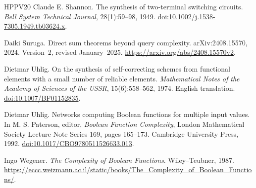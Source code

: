 \documentclass[11pt]{article}
\begin{document}
\begin{thebibliography}{HPPV20}
Claude E. Shannon.
\newblock The synthesis of two-terminal switching circuits.
\newblock \emph{Bell System Technical Journal}, 28(1):59--98, 1949.
\newblock \href{https://doi.org/10.1002/j.1538-7305.1949.tb03624.x}{doi:10.1002/j.1538-7305.1949.tb03624.x}.

Daiki Suruga.
\newblock Direct sum theorems beyond query complexity.
\newblock arXiv:2408.15570, 2024. Version~2, revised January~2025.
\newblock \url{https://arxiv.org/abs/2408.15570v2}.

Dietmar Uhlig.
\newblock On the synthesis of self-correcting schemes from functional elements
with a small number of reliable elements.
\newblock \emph{Mathematical Notes of the Academy of Sciences of the USSR},
15(6):558--562, 1974.
\newblock English translation.
\newblock \href{https://doi.org/10.1007/BF01152835}{doi:10.1007/BF01152835}.

Dietmar Uhlig.
\newblock Networks computing Boolean functions for multiple input values.
\newblock In M. S. Paterson, editor, \emph{Boolean Function Complexity},
London Mathematical Society Lecture Note Series 169, pages 165--173. Cambridge
University Press, 1992.
\newblock \href{https://doi.org/10.1017/CBO9780511526633.013}{doi:10.1017/CBO9780511526633.013}.

Ingo Wegener.
\newblock \emph{The Complexity of Boolean Functions}.
\newblock Wiley--Teubner, 1987.
\newblock \url{https://eccc.weizmann.ac.il/static/books/The_Complexity_of_Boolean_Functions/}.

\end{thebibliography}
\end{document}
